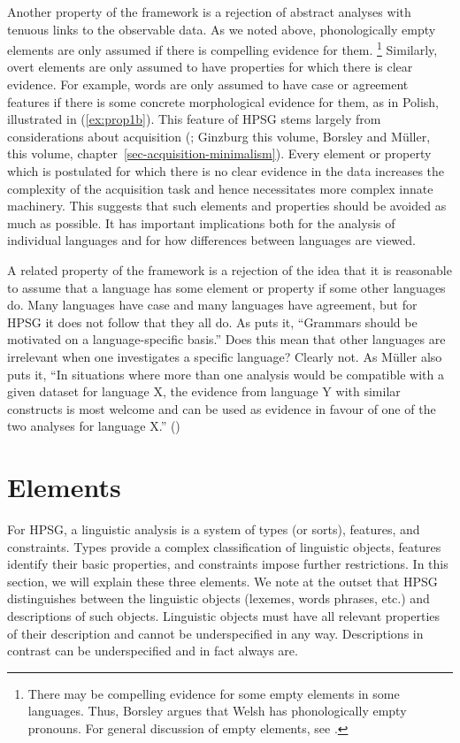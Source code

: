 \documentclass[output=paper
	        ,collection
	        ,collectionchapter
 	        ,biblatex
                ,babelshorthands
                ,newtxmath
                ,draftmode
                ,colorlinks, citecolor=brown
]{langscibook}
\begin{document}
Another property of the framework is a rejection of abstract analyses with tenuous links to the observable data. As we noted above, phonologically empty elements are only assumed if there is compelling evidence for them.%
%
\footnote{There may be compelling evidence for some empty elements in some languages. Thus, \citet[section~8]{Borsley2009a-u}Borsley argues that Welsh has phonologically empty pronouns. For general discussion of empty elements, see \citet[chapter~19.2]{MuellerGT-Eng1-linked}.}
%
Similarly, overt elements are only assumed to have properties for which there is clear evidence. For example, words are only assumed to have case or agreement features if there is some concrete morphological evidence for them, as in Polish, illustrated in (\ref{ex:prop1b}). This feature of HPSG stems largely from considerations about acquisition (\citealt[chapter~19]{MuellerGT-Eng1-linked}; Ginzburg this volume, Borsley and Müller, this volume, chapter~\ref{sec-acquisition-minimalism}). Every element or property which is postulated for which there is no clear evidence in the data increases the complexity of the acquisition task and hence necessitates more complex innate machinery. This suggests that such elements and properties should be avoided as much as possible. It has important implications both for the analysis of individual languages and for how differences between languages are viewed.
	
A related property of the framework is a rejection of the idea that it is reasonable to assume that a language has some element or property if some other languages do. Many languages have case and many languages have agreement, but for HPSG it does not follow that they all do. As \citet[25]{MuellerCoreGram} puts it, “Grammars should be motivated on a language-specific basis.” Does this mean that other languages are irrelevant when one investigates a specific language? Clearly not. As Müller also puts it, “In situations where more than one analysis would be compatible with a given dataset for language X, the evidence from language Y with similar constructs is most welcome and can be used as evidence in favour of one of the two analyses for language X.” (\citeyear[43]{MuellerCoreGram})


\section{Elements}

For HPSG, a linguistic analysis is a system of types (or sorts), features, and constraints. Types provide a complex classification of linguistic objects, features identify their basic properties, and constraints impose further restrictions. In this section, we will explain these three elements. We note at the outset that HPSG distinguishes between the linguistic objects (lexemes, words phrases, etc.) and descriptions of such objects. Linguistic objects must have all relevant properties of their description and cannot be underspecified in any way. Descriptions in contrast can be underspecified and in fact always are.
\end{document}
